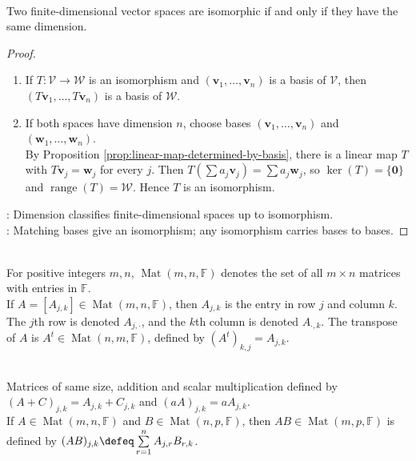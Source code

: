 \begin{theorem} \label{thm:finite-dimensional-isomorphic-iff-same-dimension} \\
Two finite-dimensional vector spaces are isomorphic if and only if they have the same dimension.
\begin{proof}
\begin{enumerate}[label=\roman*.]
\setlength{\itemsep}{0pt}
\item[$(\Rightarrow)$] If $T:\mathcal{V}\to\mathcal{W}$ is an isomorphism and $(\mathbf{v}_1,\ldots,\mathbf{v}_n)$ is a basis of $\mathcal{V}$, then $(T\mathbf{v}_1,\ldots,T\mathbf{v}_n)$ is a basis of $\mathcal{W}$.
\item[$(\Leftarrow)$] If both spaces have dimension $n$, choose bases $(\mathbf{v}_1,\ldots,\mathbf{v}_n)$ and $(\mathbf{w}_1,\ldots,\mathbf{w}_n)$.\\
By Proposition \ref{prop:linear-map-determined-by-basis}, there is a linear map $T$ with $T\mathbf{v}_j=\mathbf{w}_j$ for every $j$. Then $T(\sum a_j\mathbf{v}_j)=\sum a_j\mathbf{w}_j$, so $\ker(T)=\{\mathbf{0}\}$ and $\operatorname{range}(T)=\mathcal{W}$. Hence $T$ is an isomorphism.
\end{enumerate}
: Dimension classifies finite-dimensional spaces up to isomorphism.\\
: Matching bases give an isomorphism; any isomorphism carries bases to bases.
\end{proof}
\end{theorem}

\begin{definition} \\
For positive integers $m,n$, $\operatorname{Mat}(m,n,\mathbb{F})$ denotes the set of all $m\times n$ matrices with entries in $\mathbb{F}$.\\
If $A=[A_{j,k}]\in\operatorname{Mat}(m,n,\mathbb{F})$, then $A_{j,k}$ is the entry in row $j$ and column $k$. The $j$th row is denoted $A_{j,\cdot}$, and the $k$th column is denoted $A_{\cdot,k}$. The transpose of $A$ is $A^t\in\operatorname{Mat}(n,m,\mathbb{F})$, defined by $(A^t)_{k,j}=A_{j,k}$.
\end{definition}

\begin{definition} \\
Matrices of same size, addition and scalar multiplication defined by $(A+C)_{j,k}=A_{j,k}+C_{j,k}$ and $(aA)_{j,k}=aA_{j,k}$.\\
If $A\in\operatorname{Mat}(m,n,\mathbb{F})$ and $B\in\operatorname{Mat}(n,p,\mathbb{F})$, then $AB\in\operatorname{Mat}(m,p,\mathbb{F})$ is defined by $(AB)_{j,k}\defeq\sum\limits_{r=1}^n A_{j,r}B_{r,k}$.
\end{definition}

